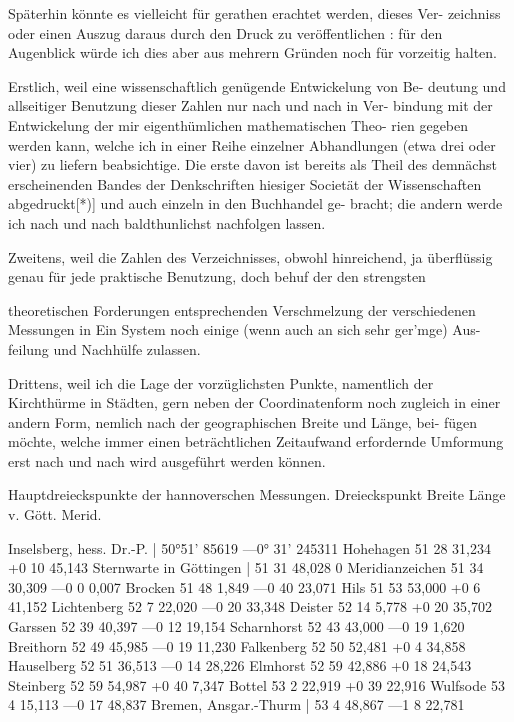 \documentclass[12pt,a4paper]{article}
\theoremstyle{plain}
\theoremstyle{definition}
\theoremstyle{remark}
\begin{document}
\noindent
Späterhin könnte es vielleicht für gerathen erachtet werden, dieses Ver-
zeichniss oder einen Auszug daraus durch den Druck zu veröffentlichen : für den
Augenblick würde ich dies aber aus mehrern Gründen noch für vorzeitig halten.

\noindent
Erstlich, weil eine wissenschaftlich genügende Entwickelung von Be-
deutung und allseitiger Benutzung dieser Zahlen nur nach und nach in Ver-
bindung mit der Entwickelung der mir eigenthümlichen mathematischen Theo-
rien gegeben werden kann, welche ich in einer Reihe einzelner Abhandlungen
(etwa drei oder vier) zu liefern beabsichtige. Die erste davon ist bereits als
Theil des demnächst erscheinenden Bandes der Denkschriften hiesiger Societät
der Wissenschaften abgedruckt[*)] und auch einzeln in den Buchhandel ge-
bracht; die andern werde ich nach und nach baldthunlichst nachfolgen lassen.

\noindent
Zweitens, weil die Zahlen des Verzeichnisses, obwohl hinreichend, ja
überflüssig genau für jede praktische Benutzung, doch behuf der den strengsten


\noindent

\noindent

\noindent
theoretischen Forderungen entsprechenden Verschmelzung der verschiedenen
Messungen in Ein System noch einige (wenn auch an sich sehr ger'mge) Aus-
feilung und Nachhülfe zulassen.

\noindent
Drittens, weil ich die Lage der vorzüglichsten Punkte, namentlich der
Kirchthürme in Städten, gern neben der Coordinatenform noch zugleich in
einer andern Form, nemlich nach der geographischen Breite und Länge, bei-
fügen möchte, welche immer einen beträchtlichen Zeitaufwand erfordernde
Umformung erst nach und nach wird ausgeführt werden können.

\noindent
[3.]
Hauptdreieckspunkte der hannoverschen Messungen.
Dreieckspunkt Breite Länge v. Gött. Merid.

\noindent
Inselsberg, hess. Dr.-P. | 50°51' 85619 ---0° 31' 245311
Hohehagen 51 28 31,234 +0 10 45,143
Sternwarte in Göttingen | 51 31 48,028 0
Meridianzeichen 51 34 30,309 ---0 0 0,007
Brocken 51 48 1,849 ---0 40 23,071
Hils 51 53 53,000 +0 6 41,152
Lichtenberg 52 7 22,020 ---0 20 33,348
Deister 52 14 5,778 +0 20 35,702
Garssen 52 39 40,397 ---0 12 19,154
Scharnhorst 52 43 43,000 ---0 19 1,620
Breithorn 52 49 45,985 ---0 19 11,230
Falkenberg 52 50 52,481 +0 4 34,858
Hauselberg 52 51 36,513 ---0 14 28,226
Elmhorst 52 59 42,886 +0 18 24,543
Steinberg 52 59 54,987 +0 40 7,347
Bottel 53 2 22,919 +0 39 22,916
Wulfsode 53 4 15,113 ---0 17 48,837
Bremen, Ansgar.-Thurm | 53 4 48,867 ---1 8 22,781
\end{document}
